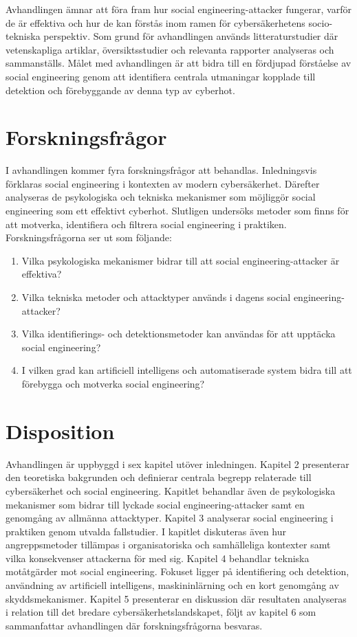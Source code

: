 Avhandlingen ämnar att föra fram hur social engineering-attacker fungerar, varför de är effektiva och hur de kan förstås inom ramen för cybersäkerhetens socio-tekniska perspektiv. 
Som grund för avhandlingen används litteraturstudier där vetenskapliga artiklar, översiktsstudier och relevanta rapporter analyseras och sammanställs. Målet med avhandlingen är att bidra till en 
fördjupad förståelse av social engineering genom att identifiera centrala utmaningar kopplade till detektion och förebyggande av denna typ av cyberhot. 

\section{Forskningsfrågor}
I avhandlingen kommer fyra forskningsfrågor att behandlas. Inledningsvis förklaras social engineering i kontexten av modern cybersäkerhet. 
Därefter analyseras de psykologiska och tekniska mekanismer som möjliggör social engineering som ett effektivt cyberhot. Slutligen undersöks metoder som finns för att motverka, 
identifiera och filtrera social engineering i praktiken. Forskningsfrågorna ser ut som följande:
\begin{enumerate}
    \item Vilka psykologiska mekanismer bidrar till att social engineering-attacker är effektiva?
    \item Vilka tekniska metoder och attacktyper används i dagens social engineering-attacker?
    \item Vilka identifierings- och detektionsmetoder kan användas för att upptäcka social engineering?
    \item I vilken grad kan artificiell intelligens och automatiserade system bidra till att förebygga och motverka social engineering?
\end{enumerate}


\section{Disposition}
Avhandlingen är uppbyggd i sex kapitel utöver inledningen. Kapitel 2 presenterar den teoretiska bakgrunden och definierar centrala begrepp relaterade
till cybersäkerhet och social engineering. Kapitlet behandlar även de psykologiska mekanismer som bidrar till lyckade social engineering-attacker samt en genomgång av allmänna attacktyper.
Kapitel 3 analyserar social engineering i praktiken genom utvalda fallstudier. I kapitlet diskuteras även hur angreppsmetoder tillämpas i organisatoriska och samhälleliga kontexter samt vilka
konsekvenser attackerna för med sig. Kapitel 4 behandlar tekniska motåtgärder mot social engineering. Fokuset ligger på identifiering och detektion, användning av artificiell intelligens,
maskininlärning och en kort genomgång av skyddsmekanismer. Kapitel 5 presenterar en diskussion där resultaten analyseras i relation till det bredare cybersäkerhetslandskapet, följt av
kapitel 6 som sammanfattar avhandlingen där forskningsfrågorna besvaras.